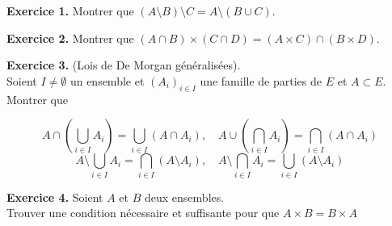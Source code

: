 \documentclass[a4paper, 10pt]{report}
\begin{document}
	
	\renewcommand{\headrule}{%
		\vspace{-4pt}\hrulefill
		\raisebox{-6.8pt}{\ \texttt{[image: ../../icon.png]}}
		\hrulefill
	}	
	\pagestyle{fancy}
	\fancyhf{}
	
	
	\noindent
	\textbf{Exercice 1.} Montrer que $(A \setminus B) \setminus C
		= A \setminus (B \cup C)$.
	
	\vspace{5mm}
	\noindent
	\textbf{Exercice 2.}  Montrer que $(A \cap B) \times (C \cap D)
		= (A \times C) \cap (B \times D)$.
	
	\vspace{5mm}
	\noindent
	\textbf{Exercice 3.} (Lois de De Morgan généralisées).\\
	Soient $I \neq \emptyset$ un ensemble et $(A_i)_{i \in I}$
	une famille de parties de $E$ et $A \subset E$. Montrer que
	
	\[
		A \cap \left(\bigcup\limits_{i \in I} A_i\right) =
			\bigcup\limits_{i \in I}(A \cap A_i),
		\quad
		A \cup \left(\bigcap\limits_{i \in I} A_i\right) =
			\bigcap\limits_{i \in I}(A \cap A_i)
	\]
	\[
		A \setminus \bigcup\limits_{i \in I} A_i =
			\bigcap\limits_{i \in I} (A \setminus A_i),
		\quad
		A \setminus \bigcap\limits_{i \in I} A_i =
			\bigcup\limits_{i \in I} (A \setminus A_i)
	\]
		

	\vspace{5mm}
	\noindent
	{\color{red}\textbf{Exercice 4.}}
	Soient $A$ et $B$ deux ensembles.\\
	Trouver une condition nécessaire et suffisante pour que
	$A \times B = B \times A$
	
\end{document}
